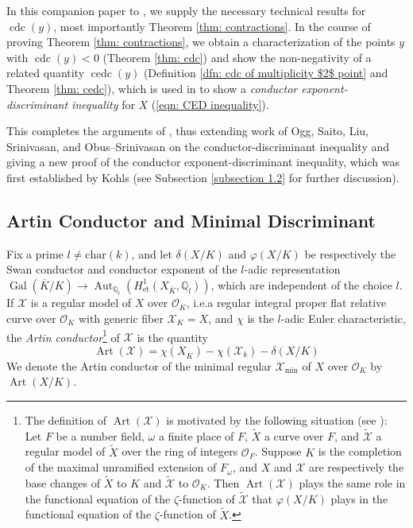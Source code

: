 \documentclass[12pt]{amsart}
\numberwithin{equation}{section}
\theoremstyle{definition}
\newcommand{\Q}{\mathbb Q}
\renewcommand{\O}{\mathcal{O}}
\renewcommand{\phi}{\varphi}
\renewcommand{\c}[1]{\overline{#1}}
\newcommand{\X}{\mathcal{X}}
\newcommand{\tx}[1]{\text{#1}}
\DeclareMathOperator{\Gal}{Gal}
\DeclareMathOperator{\Art}{Art}
\DeclareMathOperator{\Aut}{Aut}
\DeclareMathOperator{\cdc}{cdc}
\DeclareMathOperator{\cedc}{cedc}
\begin{document}
In this companion paper to \cite{Part1}, we supply the necessary technical results for $\cdc(y)$, most importantly Theorem \ref{thm: contractions}. In the course of proving Theorem \ref{thm: contractions}, we obtain a characterization of the points $y$ with $\cdc(y)<0$ (Theorem \ref{thm: cdc}) and show the non-negativity of a related quantity $\cedc(y)$ (Definition \ref{dfn: cdc of multiplicity $2$ point} and Theorem \ref{thm: cedc}), which is used in \cite{Part1} to show a \textit{conductor exponent-discriminant inequality} for $X$ (\eqref{eqn: CED inequality}). 

This completes the arguments of \cite{Part1}, thus extending work of Ogg, Saito, Liu, Srinivasan, and Obus--Srinivasan on the conductor-discriminant inequality and giving a new proof of the conductor exponent-discriminant inequality, which was first established by Kohls (see Subsection \ref{subsection 1.2} for further discussion).

\subsection{Artin Conductor and Minimal Discriminant}\hfill

Fix a prime $l\neq\tx{char}(k)$, and let $\delta(X/K)$ and $\phi(X/K)$ be respectively the Swan conductor and conductor exponent of the $l$-adic representation $\Gal(\c{K}/K)\to\Aut_{\Q_l}(H^1_{\tx{et}}(X_{\c{K}},\Q_l))$, which are independent of the choice $l$. If $\X$ is a regular model of $X$ over $\O_K$, i.e.\;a regular integral proper flat relative curve over $\O_K$ with generic fiber $\X_K=X$, and $\chi$ is the $l$-adic Euler characteristic, the \textit{Artin conductor}\footnote{The definition of $\Art(\X)$ is motivated by the following situation (see \cite[Proposition 1.1]{Bloch}): Let $F$ be a number field, $\omega$ a finite place of $F$, $\tilde{X}$ a curve over $F$, and $\tilde{\X}$ a regular model of $\tilde{X}$ over the ring of integers $\O_F$. Suppose $K$ is the completion of the maximal unramified extension of $F_\omega$, and $X$ and $\X$ are respectively the base changes of $\tilde{X}$ to $K$ and $\tilde{\X}$ to $\O_K$. Then $\Art(\X)$ plays the same role in the functional equation of the $\zeta$-function of $\tilde{\X}$ that $\phi(X/K)$ plays in the functional equation of the $\zeta$-function of $\tilde{X}$.} of $\X$ is the quantity
\[\Art(\X)=\chi(X_{\c{K}})-\chi(\X_k)-\delta(X/K)\]
We denote the Artin conductor of the minimal regular $\X_{\min}$ of $X$ over $\O_K$ by $\Art(X/K)$.
\end{document}
